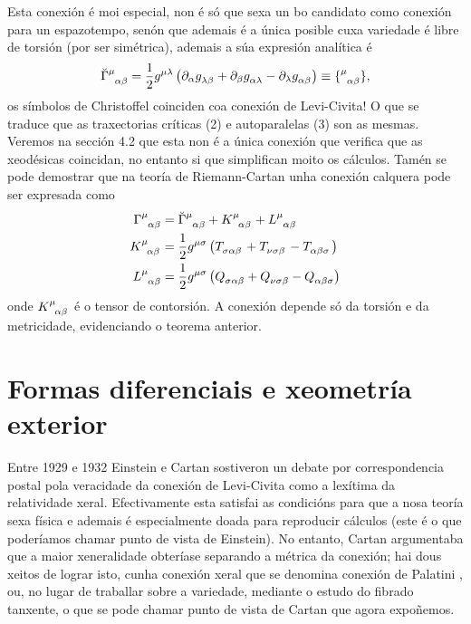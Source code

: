 Esta conexión é moi especial, non é só que sexa un bo candidato como conexión para un espazotempo, senón que ademais é a única posible cuxa variedade é libre de torsión (por ser simétrica), ademais a súa expresión analítica é 
\begin{align}
      \breve\Gamma\indices{^\mu_\alpha_\beta}= \levicivita \equiv \{ \indices{^\mu_\alpha_\beta}\},
\end{align}
os símbolos de Christoffel coinciden coa conexión de Levi-Civita! O que se traduce que as traxectorias críticas (2) e autoparalelas (3) son as mesmas. Veremos na sección 4.2 que esta non é a única conexión que verifica que as xeodésicas coincidan, no entanto si que simplifican moito os cálculos. Tamén se pode demostrar que na teoría de Riemann-Cartan unha conexión calquera pode ser expresada como
\begin{align}
    \Gamma\indices{^\mu_\alpha_\beta} &= \breve\Gamma\indices{^\mu_\alpha_\beta} + K\indices{^\mu_\alpha_\beta} + L\indices{^\mu_\alpha_\beta}\\
    \nonumber K\indices{^\mu_\alpha_\beta} &= \frac{1}{2}g\indices{^\mu^\sigma}\left(T\indices{_\sigma_\alpha_\beta} + T \indices{_\nu_\sigma_\beta} - T\indices{_\alpha_\beta_\sigma}\right)\\
    \nonumber L\indices{^\mu_\alpha_\beta} &= \frac{1}{2}g\indices{^\mu^\sigma}\left(Q\indices{_\sigma_\alpha_\beta} + Q \indices{_\nu_\sigma_\beta} - Q\indices{_\alpha_\beta_\sigma}\right)
\end{align}
onde $K\indices{^\mu_\alpha_\beta}$ é o tensor de contorsión. A conexión depende só da torsión e da metricidade, evidenciando o teorema anterior.

\section{Formas diferenciais e xeometría exterior}
Entre 1929 e 1932 Einstein e Cartan sostiveron un debate por correspondencia postal \cite{CH_supergravities} pola veracidade da conexión de Levi-Civita como a lexítima da relatividade xeral. Efectivamente esta satisfai as condicións para que a nosa teoría sexa física e ademais é especialmente doada para reproducir cálculos (este é o que poderíamos chamar punto de vista de Einstein). No entanto, Cartan argumentaba que a maior xeneralidade obteríase separando a métrica da conexión; hai dous xeitos de lograr isto, cunha conexión xeral que se denomina conexión de Palatini \cite{Lovelock_metricformulation,Bernal_2017}, ou, no lugar de traballar sobre a variedade, mediante o estudo do fibrado tanxente, o que se pode chamar punto de vista de Cartan que agora expoñemos.
